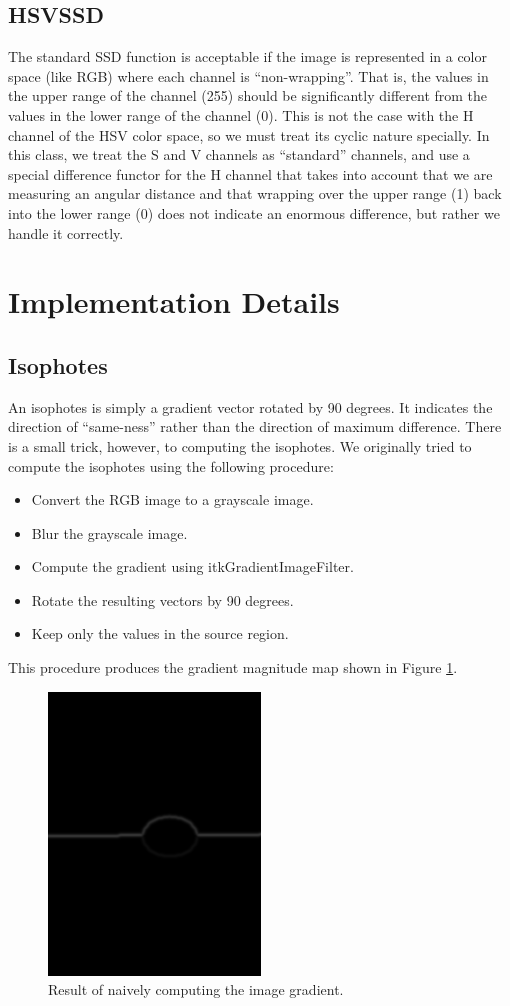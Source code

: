 \documentclass{InsightArticle}
\begin{document}
\subsection{HSVSSD}
The standard SSD function is acceptable if the image is represented in a color space (like RGB) where each channel is ``non-wrapping''. That is, the values in the upper range of the channel (255) should be significantly different from the values in the lower range of the channel (0). This is not the case with the H channel of the HSV color space, so we must treat its cyclic nature specially. In this class, we treat the S and V channels as ``standard'' channels, and use a special difference functor for the H channel that takes into account that we are measuring an angular distance and that wrapping over the upper range (1) back into the lower range (0) does not indicate an enormous difference, but rather we handle it correctly.

\section{Implementation Details}
\label{sec:ImplementationDetails}

\subsection{Isophotes}
An isophotes is simply a gradient vector rotated by 90 degrees. It indicates the direction of ``same-ness'' rather than the direction of maximum difference. There is a small trick, however, to computing the isophotes. We originally tried to compute the isophotes using the following procedure:

\begin{itemize}
 \item Convert the RGB image to a grayscale image.
 \item Blur the grayscale image.
 \item Compute the gradient using itkGradientImageFilter.
 \item Rotate the resulting vectors by 90 degrees.
 \item Keep only the values in the source region.
\end{itemize}

This procedure produces the gradient magnitude map shown in Figure \ref{fig:ErroneousGradient}.
\begin{figure}[H]
  \centering
  \includegraphics[width=0.3\linewidth]{images/ErroneousGradient}
  \caption{Result of naively computing the image gradient.}
  \label{fig:ErroneousGradient}
\end{figure}
\end{document}
